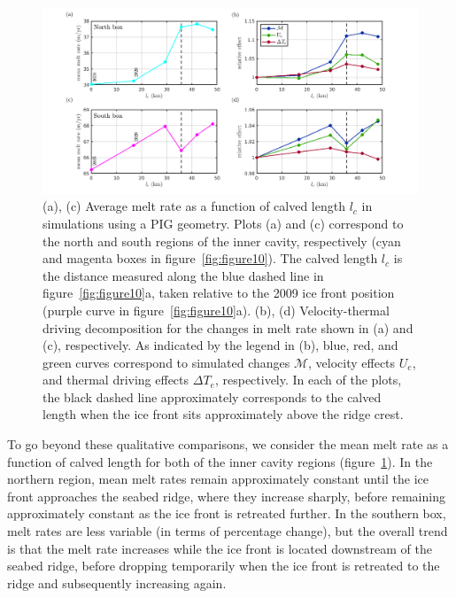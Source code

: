 \documentclass[draft]{agujournal2019}
\begin{document}
\begin{figure}
    \centering
    \includegraphics[width = \textwidth]{../make_figures/plots/figure13.png}
    \caption{(a), (c) Average melt rate as a function of calved length $l_c$ in simulations using a PIG geometry. Plots (a) and (c) correspond to the north and south regions of the inner cavity, respectively (cyan and magenta boxes in figure~\ref{fig:figure10}). The calved length $l_c$ is the distance measured along the blue dashed line in figure~\ref{fig:figure10}a, taken relative to the 2009 ice front position (purple curve in figure~\ref{fig:figure10}a). (b), (d) Velocity-thermal driving decomposition for the changes in melt rate shown in (a) and (c), respectively. As indicated by the legend in (b), blue, red, and green curves correspond to simulated changes $\mathcal{M}$, velocity effects $U_e$, and thermal driving effects $\Delta T_e$, respectively. In each of the plots, the black dashed line approximately corresponds to the calved length when the ice front sits approximately above the ridge crest.}\label{fig:figure13}
\end{figure}

To go beyond these qualitative comparisons, we consider the mean melt rate as a function of calved length for both of the inner cavity regions (figure~\ref{fig:figure13}). In the northern region, mean melt rates remain approximately constant until the ice front approaches the seabed ridge, where they increase sharply, before remaining approximately constant as the ice front is retreated further. In the southern box, melt rates are less variable (in terms of percentage change), but the overall trend is that the melt rate increases while the ice front is located downstream of the seabed ridge, before dropping temporarily when the ice front is retreated to the ridge and subsequently increasing again. 
\end{document}
